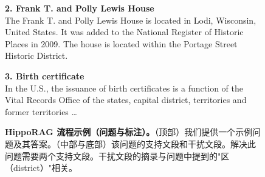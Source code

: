 \documentclass[11pt,UTF8,fontset=fandol]{ctexart}
\begin{document}
\begin{figure}[H]
\begin{tcolorbox}[colback=white,colframe=black!55,boxrule=0.5pt,left=4pt,right=4pt,top=3pt,bottom=3pt,width=\linewidth]
\textbf{2. Frank T. and Polly Lewis House}\\
The Frank T. and Polly Lewis House is located in Lodi, Wisconsin, United States. It was added to the National Register of Historic Places in 2009. The house is located within the Portage Street Historic District.

\textbf{3. Birth certificate}\\
In the U.S., the issuance of birth certificates is a function of the Vital Records Office of the states, capital district, territories and former territories \ldots
\end{tcolorbox}
\caption{\textbf{HippoRAG 流程示例（问题与标注）。}（顶部）我们提供一个示例问题及其答案。（中部与底部）该问题的支持文段和干扰文段。解决此问题需要两个支持文段。干扰文段的摘录与问题中提到的"区（district）"相关。}
\label{fig:3}
\end{figure}
\end{document}
